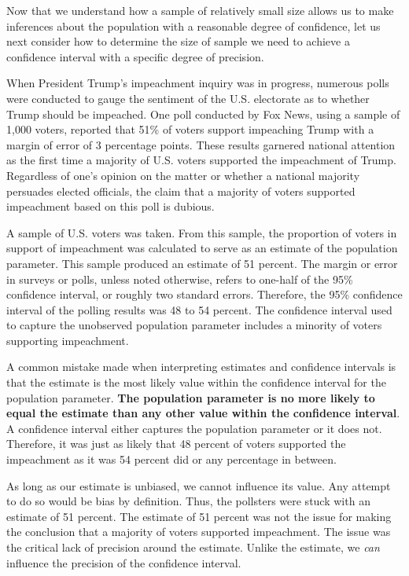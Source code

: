 \documentclass[
]{book}
\begin{document}
Now that we understand how a sample of relatively small size allows us to make inferences about the population with a reasonable degree of confidence, let us next consider how to determine the size of sample we need to achieve a confidence interval with a specific degree of precision.

When President Trump's impeachment inquiry was in progress, numerous polls were conducted to gauge the sentiment of the U.S. electorate as to whether Trump should be impeached. One poll conducted by Fox News, using a sample of 1,000 voters, reported that 51\% of voters support impeaching Trump with a margin of error of 3 percentage points. These results garnered national attention as the first time a majority of U.S. voters supported the impeachment of Trump. Regardless of one's opinion on the matter or whether a national majority persuades elected officials, the claim that a majority of voters supported impeachment based on this poll is dubious.

A sample of U.S. voters was taken. From this sample, the proportion of voters in support of impeachment was calculated to serve as an estimate of the population parameter. This sample produced an estimate of 51 percent. The margin or error in surveys or polls, unless noted otherwise, refers to one-half of the 95\% confidence interval, or roughly two standard errors. Therefore, the 95\% confidence interval of the polling results was 48 to 54 percent. The confidence interval used to capture the unobserved population parameter includes a minority of voters supporting impeachment.

A common mistake made when interpreting estimates and confidence intervals is that the estimate is the most likely value within the confidence interval for the population parameter. \textbf{The population parameter is no more likely to equal the estimate than any other value within the confidence interval}. A confidence interval either captures the population parameter or it does not. Therefore, it was just as likely that 48 percent of voters supported the impeachment as it was 54 percent did or any percentage in between.

As long as our estimate is unbiased, we cannot influence its value. Any attempt to do so would be bias by definition. Thus, the pollsters were stuck with an estimate of 51 percent. The estimate of 51 percent was not the issue for making the conclusion that a majority of voters supported impeachment. The issue was the critical lack of precision around the estimate. Unlike the estimate, we \emph{can} influence the precision of the confidence interval.
\end{document}
